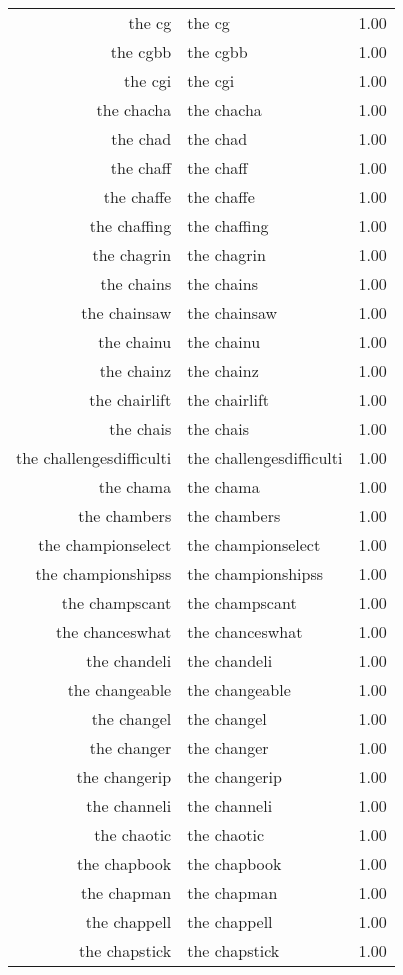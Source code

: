 \begin{table}[ht]
\begin{tabular}{rlr}
  the cg & the cg & 1.00 \\ 
  the cgbb & the cgbb & 1.00 \\ 
  the cgi & the cgi & 1.00 \\ 
  the chacha & the chacha & 1.00 \\ 
  the chad & the chad & 1.00 \\ 
  the chaff & the chaff & 1.00 \\ 
  the chaffe & the chaffe & 1.00 \\ 
  the chaffing & the chaffing & 1.00 \\ 
  the chagrin & the chagrin & 1.00 \\ 
  the chains & the chains & 1.00 \\ 
  the chainsaw & the chainsaw & 1.00 \\ 
  the chainu & the chainu & 1.00 \\ 
  the chainz & the chainz & 1.00 \\ 
  the chairlift & the chairlift & 1.00 \\ 
  the chais & the chais & 1.00 \\ 
  the challengesdifficulti & the challengesdifficulti & 1.00 \\ 
  the chama & the chama & 1.00 \\ 
  the chambers & the chambers & 1.00 \\ 
  the championselect & the championselect & 1.00 \\ 
  the championshipss & the championshipss & 1.00 \\ 
  the champscant & the champscant & 1.00 \\ 
  the chanceswhat & the chanceswhat & 1.00 \\ 
  the chandeli & the chandeli & 1.00 \\ 
  the changeable & the changeable & 1.00 \\ 
  the changel & the changel & 1.00 \\ 
  the changer & the changer & 1.00 \\ 
  the changerip & the changerip & 1.00 \\ 
  the channeli & the channeli & 1.00 \\ 
  the chaotic & the chaotic & 1.00 \\ 
  the chapbook & the chapbook & 1.00 \\ 
  the chapman & the chapman & 1.00 \\ 
  the chappell & the chappell & 1.00 \\ 
  the chapstick & the chapstick & 1.00 \\ 

\end{tabular}
\end{table}
